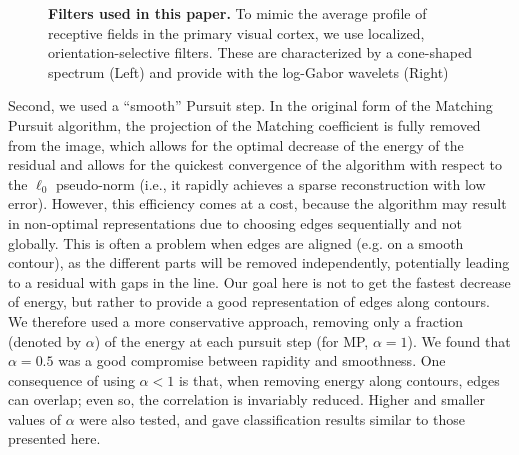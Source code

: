 \documentclass[a4paper, 10pt, twocolumns]{article}
\begin{document}
\begin{figure}%
\caption{
{\bf Filters used in this paper.} To mimic the average profile of receptive fields in the primary visual cortex, we use localized, orientation-selective filters. These are characterized by a cone-shaped spectrum (Left) and provide with the log-Gabor wavelets (Right)
\label{fig:EUVIP_loggabor}}%
\end{figure}%

Second, we used a ``smooth'' Pursuit step.
In the original form of the Matching Pursuit algorithm,
the projection of the Matching coefficient is fully removed from the image,
which allows for the optimal decrease of the energy of the residual
and allows for the quickest convergence of the algorithm
with respect to the $\ell_0$ pseudo-norm
(i.e., it rapidly achieves a sparse reconstruction with low error).
However, this efficiency comes at a cost,
because the algorithm may result in non-optimal representations
due to choosing edges sequentially and not globally.
This is often a problem when edges are aligned (e.g. on a smooth contour),
as the different parts will be removed independently, potentially leading
to a residual with gaps in the line.
Our goal here is not to get the fastest decrease of energy,
but rather to provide a good representation of edges along contours.
We therefore used a more conservative approach,
removing only a fraction (denoted by $\alpha$)
of the energy at each pursuit step (for MP, $\alpha=1$).
We found that $\alpha=0.5$ was a good compromise between rapidity and smoothness.
One consequence of using $\alpha<1$ is that, when removing energy along contours,
edges can overlap; even so, the correlation is invariably reduced.
Higher and smaller values of $\alpha$ were also tested,
and gave classification results similar to those presented here.
\end{document}
